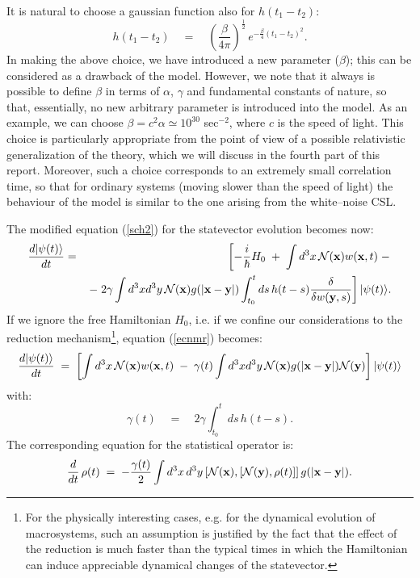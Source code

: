 \documentclass[12pt]{article}
\begin{document}
It is  natural to choose a gaussian function also for $h(t_{1} -
t_{2})$:
\begin{equation}
h(t_{1} - t_{2}) \quad = \quad
\left(\frac{\beta}{4\pi}\right)^{\frac{1}{2}}\, e^{\displaystyle -
\frac{\beta}{4} (t_{1} - t_{2})^{2}}.
\end{equation}
In making the above choice, we have introduced a new parameter
($\beta$); this can be considered as a drawback of the model.
However, we note that it always is possible to define $\beta$ in
terms of $\alpha$, $\gamma$ and fundamental constants of nature,
so that, essentially,  no new arbitrary parameter is introduced
into the model. As an example, we can choose $\beta = c^{2}\alpha
\simeq 10^{30}$ sec${}^{-2}$, where $c$ is the speed of light.
This choice is particularly appropriate from the point of view of
a possible relativistic generalization of the theory, which we
will discuss in the fourth part of this report. Moreover, such a
choice corresponds to an extremely small correlation time, so that
for ordinary systems (moving slower than the speed of light) the
behaviour of the model is similar to the one arising from the
white--noise CSL.

The modified equation (\ref{sch2}) for the statevector evolution
becomes now:
\begin{eqnarray} \label{ecnmr}
\frac{d |\psi(t)\rangle}{dt} & = & \left[ -\frac{i}{\hbar} H_{0}
\; + \; \int d^{3}x\, {\mathcal N}{(\bf x}) w({\bf x}, t) \; -
\right.
\\
& & \left. - \; 2\gamma \int d^{3}x d^{3}y\, {\mathcal N}({\bf x})
g(|{\bf x} - {\bf y}|) \int_{t_{0}}^{t} ds\, h(t - s)
\frac{\delta}{\delta w({\bf y}, s)} \right]|\psi(t)\rangle.
\nonumber
\end{eqnarray}
If we ignore the free Hamiltonian $H_{0}$, i.e. if we confine our
considerations to the reduction mechanism\footnote{For the
physically interesting cases, e.g. for the dynamical evolution of
macrosystems, such an assumption is justified by the fact that the
effect of the reduction is much faster than the typical times in
which the Hamiltonian can induce appreciable dynamical changes of
the statevector.}, equation (\ref{ecnmr}) becomes:
\begin{equation} \label{enmrsh}
\frac{d |\psi(t)\rangle}{dt} \; = \; \left[ \int d^{3}x\,
{\mathcal N}{(\bf x}) w({\bf x}, t) \; - \; \gamma(t) \int d^{3}x
d^{3}y\, {\mathcal N}({\bf x})g(|{\bf x} - {\bf y}|) {\mathcal
N}({\bf y}) \right] |\psi(t)\rangle
\end{equation}
with:
\begin{equation}
\gamma(t) \quad = \quad 2\gamma \int_{t_{0}}^{t} ds\, h(t - s).
\end{equation}
The corresponding equation for the statistical operator is:
\begin{equation} \label{eosnsh}
\frac{d}{dt}\, \rho(t) \; = \; -\frac{\gamma(t)}{2} \int d^{3}x\,
d^{3}y \left[ {\mathcal N}({\bf x}), \left[ {\mathcal N}({\bf y}),
\rho(t) \right] \right] g(|{\bf x} - {\bf y}|).
\end{equation}
\end{document}

